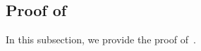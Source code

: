 \documentclass[12pt]{amsart}
\numberwithin{equation}{section}
\theoremstyle{remark}
\begin{document}




\iffalse
\subsection{Proof of~}
In this subsection, we provide the proof of~.
\end{document}
